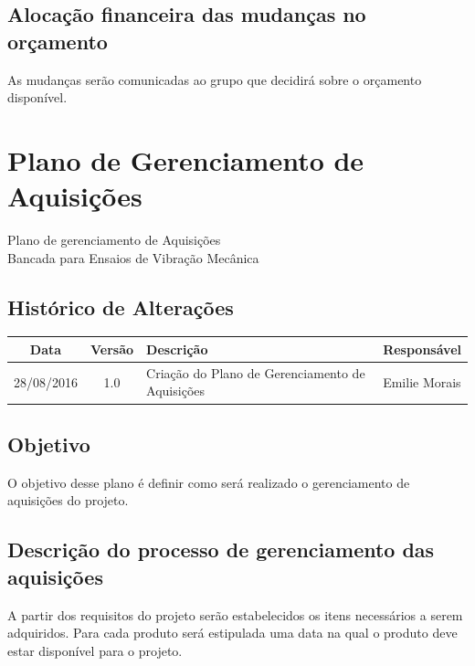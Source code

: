 \begin{apendicesenv}
\section*{Alocação financeira das mudanças no orçamento}

As mudanças serão comunicadas ao grupo que decidirá sobre o orçamento disponível.

    
\chapter{Plano de Gerenciamento de Aquisições}
	\label{plano_de_aquisicoes}    						
% 	


\begin{center}
 {\large Plano de gerenciamento de Aquisições}\\[0.2cm]
 {Bancada para Ensaios de Vibração Mecânica}\\
 \end{center}
 
 \section*{Histórico de Alterações}
\begin{table}[h]
\centering
\begin{tabular}{|c|c|p{6cm}|p{5cm}|}

Data & Versão & Descrição & Responsável\\
\hline                               
28/08/2016 & 1.0 & Criação do Plano de Gerenciamento de Aquisições & Emilie Morais\\
\hline
\end{tabular}
\end{table}

\section*{Objetivo}
  O objetivo desse plano é definir como será realizado o gerenciamento de aquisições do projeto.
  
\section*{Descrição do processo de gerenciamento das aquisições}
 A partir dos requisitos do projeto serão estabelecidos os itens necessários a serem adquiridos. Para cada produto será estipulada uma data na qual o produto deve estar disponível para o projeto. 
 

\end{apendicesenv}
